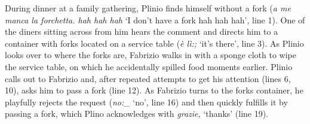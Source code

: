 \documentclass[output=paper,modfonts]{langscibook}
\begin{document}
During dinner at a family gathering, Plinio finds himself without a fork (\textit{a me manca la forchetta. hah hah hah} ‘I don't have a fork hah hah hah’, line 1). One of the diners sitting across from him hears the comment and directs him to a container with forks located on a service table (\textit{è lì:;} ‘it's there’, line 3). As Plinio looks over to where the forks are, Fabrizio walks in with a sponge cloth to wipe the service table, on which he accidentally spilled food moments earlier. Plinio calls out to Fabrizio and, after repeated attempts to get his attention (lines 6, 10), asks him to pass a fork (line 12). As Fabrizio turns to the forks container, he playfully rejects the request (\textit{no:\_} ‘no’, line 16) and then quickly fulfills it by passing a fork, which Plino acknowledges with \textit{grazie,} ‘thanks’ (line 19). 
\end{document}
